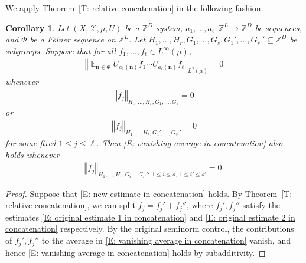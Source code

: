 \documentclass[11pt]{amsart}
\newtheorem{corollary}[lemma]{Corollary}
\theoremstyle{definition}
\DeclareMathOperator*{\E}{\mathbb{E}}
\newcommand{\Z}{{\mathbb Z}}
\newcommand{\CX}{{\mathcal X}}
\newcommand{\bn}{{\mathbf{n}}}
\newcommand{\norm}[1]{\left\Vert #1\right\Vert}
\newcommand{\1}{{\mathbf{1}}}
\begin{document}
We apply Theorem~\ref{T: relative concatenation} in the following fashion.
\begin{corollary}\label{C: relative concatenation}
    Let $(X, \CX, \mu, U)$ be a $\Z^D$-system, $a_1, \ldots, a_\ell:\Z^L\to\Z^D$ be sequences, and $\Phi$ be a F{\o}lner sequence on $\Z^L$. Let $H_1, \ldots, H_r, G_1, \ldots, G_s, G_1', \ldots, G_{s'}'\subseteq \Z^D$ be subgroups. Suppose that for all $f_1, \ldots, f_\ell\in L^\infty(\mu)$,
    \begin{align}\label{E: vanishing average in concatenation}
        \norm{\E_{\bn\in\Phi}U_{a_1(\bn)}f_1\cdots U_{a_\ell(\bn)}f_\ell}_{L^2(\mu)}=0
    \end{align}
    whenever 
    \begin{align}\label{E: original estimate 1 in concatenation}
        \norm{f_j}_{H_1, \ldots, H_r, G_1, \ldots, G_s} = 0
    \end{align}
    or 
    \begin{align}\label{E: original estimate 2 in concatenation}
        \norm{f_j}_{H_1, \ldots, H_r, G_1', \ldots, G_{s'}'} = 0
    \end{align}
    for some fixed $1\leq j\leq \ell$. Then \eqref{E: vanishing average in concatenation} also holds whenever
    \begin{align}\label{E: new estimate in concatenation}
        \norm{f_j}_{H_1, \ldots, H_r, G_i + G_{i'}'\colon\; 1\leq i\leq s,\; 1\leq i'\leq s'} = 0.
    \end{align}
\end{corollary}
\begin{proof}
    Suppose that \eqref{E: new estimate in concatenation} holds.
    By Theorem~\ref{T: relative concatenation}, we can split $f_j = f_j'+f_j''$, where $f_j',f_j''$ satisfy the estimates \eqref{E: original estimate 1 in concatenation} and \eqref{E: original estimate 2 in concatenation} respectively. By the original seminorm control, the contributions of $f_j',f_j''$ to the average in \eqref{E: vanishing average in concatenation} vanish, and hence \eqref{E: vanishing average in concatenation} holds by subadditivity.
\end{proof}
\end{document}

